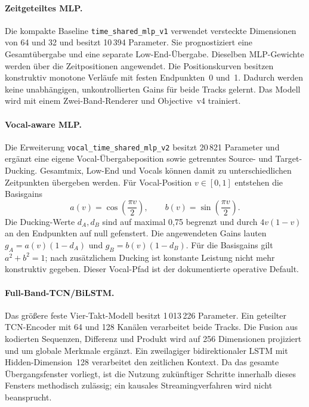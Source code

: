 \paragraph{Zeitgeteiltes MLP.}
Die kompakte Baseline \texttt{time\_shared\_mlp\_v1} verwendet versteckte Dimensionen von 64 und 32 und besitzt 10\,394 Parameter. Sie prognostiziert eine Gesamtübergabe und eine separate Low-End-Übergabe. Dieselben MLP-Gewichte werden über die Zeitpositionen angewendet. Die Positionskurven besitzen konstruktiv monotone Verläufe mit festen Endpunkten~0 und~1. Dadurch werden keine unabhängigen, unkontrollierten Gains für beide Tracks gelernt. Das Modell wird mit einem Zwei-Band-Renderer und Objective~v4 trainiert.

\paragraph{Vocal-aware MLP.}
Die Erweiterung \texttt{vocal\_time\_shared\_mlp\_v2} besitzt 20\,821 Parameter und ergänzt eine eigene Vocal-Übergabeposition sowie getrenntes Source- und Target-Ducking. Gesamtmix, Low-End und Vocals können damit zu unterschiedlichen Zeitpunkten übergeben werden. Für Vocal-Position $v\in[0,1]$ entstehen die Basisgains
\begin{equation}
 a(v)=\cos\left(\frac{\pi v}{2}\right),\qquad
 b(v)=\sin\left(\frac{\pi v}{2}\right).
\end{equation}
Die Ducking-Werte $d_A,d_B$ sind auf maximal 0,75 begrenzt und durch $4v(1-v)$ an den Endpunkten auf null gefenstert. Die angewendeten Gains lauten $g_A=a(v)(1-d_A)$ und $g_B=b(v)(1-d_B)$. Für die Basisgains gilt $a^2+b^2=1$; nach zusätzlichem Ducking ist konstante Leistung nicht mehr konstruktiv gegeben. Dieser Vocal-Pfad ist der dokumentierte operative Default.

\paragraph{Full-Band-TCN/BiLSTM.}
Das größere feste Vier-Takt-Modell besitzt 1\,013\,226 Parameter. Ein geteilter TCN-Encoder mit 64 und 128 Kanälen verarbeitet beide Tracks. Die Fusion aus kodierten Sequenzen, Differenz und Produkt wird auf 256 Dimensionen projiziert und um globale Merkmale ergänzt. Ein zweilagiger bidirektionaler LSTM mit Hidden-Dimension~128 verarbeitet den zeitlichen Kontext. Da das gesamte Übergangsfenster vorliegt, ist die Nutzung zukünftiger Schritte innerhalb dieses Fensters methodisch zulässig; ein kausales Streamingverfahren wird nicht beansprucht.

